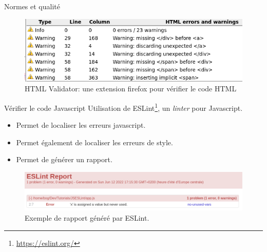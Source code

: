 \begin{frame}{Normes et qualité}

   {
    \begin{figure}
      \begin{center}
        \includegraphics[scale=0.45]{../../res/html_validator.png}
      \end{center}
      \caption{HTML Validator: une extension firefox pour vérifier le code HTML}    
    \end{figure}
  }

   {
    \begin{block}{Vérifier le code Javascript}
      Utilisation de ESLint\footnote{\url{https://eslint.org/}}, un \textit{linter} pour Javascript.
      \begin{itemize}
      \item Permet de localiser les erreurs javascript.
      \item Permet également de localiser les erreurs de style.
      \item Permet de générer un rapport.
      \end{itemize}
    \end{block}
  }

   {
    \begin{figure}
      \begin{center}
        \includegraphics[scale=0.3]{../../res/eslint.png}
      \end{center}
      \caption{Exemple de rapport généré par ESLint.}      
    \end{figure}
  }
\end{frame}
